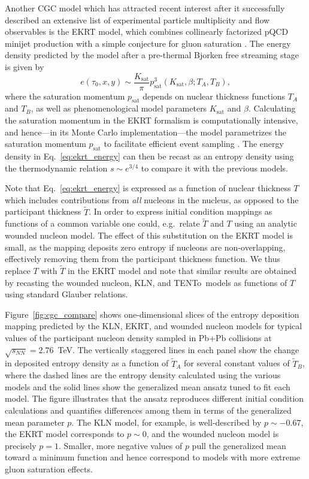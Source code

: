 \documentclass[aps,prc,reprint,amsmath,nofootinbib]{revtex4-1}
\newcommand{\trento}{T\raisebox{-0.5ex}{R}ENTo}
\newcommand{\sqrts}{\sqrt{s_{NN}}}
\newcommand{\T}{\tilde{T}}
\begin{document}
Another CGC model which has attracted recent interest after it successfully described an extensive list of experimental particle multiplicity and flow observables \cite{Niemi:2015qia, Paatelainen:2013eea} is the EKRT model, which combines collinearly factorized pQCD minijet production with a simple conjecture for gluon saturation \cite{Eskola:1999fc, Eskola:2001bf}.
The energy density predicted by the model after a pre-thermal Bjorken free streaming stage is given by
\begin{equation}
  e(\tau_0, x, y) \sim \frac{K_\text{sat}}{\pi} p_\text{sat}^3(K_\text{sat}, \beta; T_A, T_B),
  \label{eq:ekrt_energy}
\end{equation}
where the saturation momentum $p_\text{sat}$ depends on nuclear thickness functions $T_A$ and $T_B$, as well as phenomenological model parameters $K_\text{sat}$ and $\beta$.
Calculating the saturation momentum in the EKRT formalism is computationally intensive, and hence---in its Monte Carlo implementation---the model parametrizes the saturation momentum $p_\text{sat}$ to facilitate efficient event sampling \cite{Niemi:2015qia}.
The energy density in Eq.~\eqref{eq:ekrt_energy} can then be recast as an entropy density using the thermodynamic relation ${s \sim e^{3/4}}$ to compare it with the previous models.

Note that Eq.~\eqref{eq:ekrt_energy} is expressed as a function of nuclear thickness $T$ which includes contributions from \emph{all} nucleons in the nucleus, as opposed to the participant thickness $\T$.
In order to express initial condition mappings as functions of a common variable one could, e.g.\ relate $\T$ and $T$ using an analytic wounded nucleon model.
The effect of this substitution on the EKRT model is small, as the mapping deposits zero entropy if nucleons are non-overlapping, effectively removing them from the participant thickness function.
We thus replace $T$ with $\T$ in the EKRT model and note that similar results are obtained by recasting the wounded nucleon, KLN, and \trento\ models as functions of $T$ using standard Glauber relations.

Figure~\ref{fig:cgc_compare} shows one-dimensional slices of the entropy deposition mapping predicted by the KLN, EKRT, and wounded nucleon models for typical values of the participant nucleon density sampled in Pb+Pb collisions at $\sqrts=2.76$~TeV.
The vertically staggered lines in each panel show the change in deposited entropy density as a function of $\T_A$ for several constant values of $\T_B$, where the dashed lines are the entropy density calculated using the various models and the solid lines show the generalized mean ansatz tuned to fit each model.
The figure illustrates that the ansatz reproduces different initial condition calculations and quantifies differences among them in terms of the generalized mean parameter $p$.
The KLN model, for example, is well-described by $p\sim-0.67$, the EKRT model corresponds to $p \sim 0$, and the wounded nucleon model is precisely $p=1$.
Smaller, more negative values of $p$ pull the generalized mean toward a minimum function and hence correspond to models with more extreme gluon saturation effects.
\end{document}
